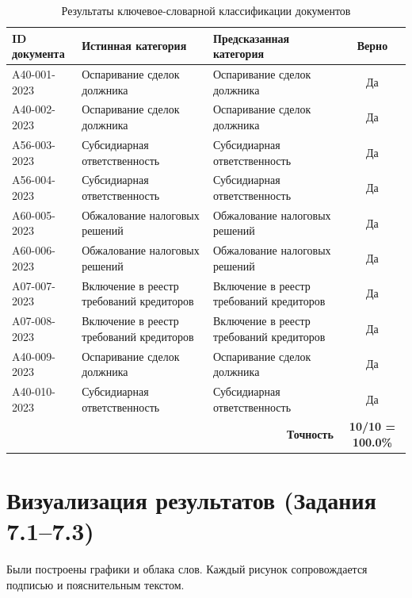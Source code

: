 \documentclass[12pt, a4paper]{report}
\begin{document}
\begin{table}[h]
  \centering
  \caption{Результаты ключевое-словарной классификации документов}
  \label{tab:classification}
  \begin{tabularx}{\textwidth}{l X X c}
    \toprule
    \rowcolor{LightBlue}
    \textsf{\textbf{ID документа}} &
    \textsf{\textbf{Истинная категория}} &
    \textsf{\textbf{Предсказанная категория}} &
    \textsf{\textbf{Верно}} \\
    \midrule
    A40-001-2023 & Оспаривание сделок должника & Оспаривание сделок должника & Да \\
    A40-002-2023 & Оспаривание сделок должника & Оспаривание сделок должника & Да \\
    A56-003-2023 & Субсидиарная ответственность & Субсидиарная ответственность & Да \\
    A56-004-2023 & Субсидиарная ответственность & Субсидиарная ответственность & Да \\
    A60-005-2023 & Обжалование налоговых решений & Обжалование налоговых решений & Да \\
    A60-006-2023 & Обжалование налоговых решений & Обжалование налоговых решений & Да \\
    A07-007-2023 & Включение в реестр требований кредиторов & Включение в реестр требований кредиторов & Да \\
    A07-008-2023 & Включение в реестр требований кредиторов & Включение в реестр требований кредиторов & Да \\
    A40-009-2023 & Оспаривание сделок должника & Оспаривание сделок должника & Да \\
    A40-010-2023 & Субсидиарная ответственность & Субсидиарная ответственность & Да \\
    \midrule
    \multicolumn{3}{r}{\textsf{\textbf{Точность}}} & \textbf{10/10 = 100.0\%} \\
    \bottomrule
  \end{tabularx}
\end{table}

\section{Визуализация результатов (Задания 7.1–7.3)}

Были построены графики и облака слов. Каждый рисунок сопровождается
подписью и пояснительным текстом.
\end{document}
